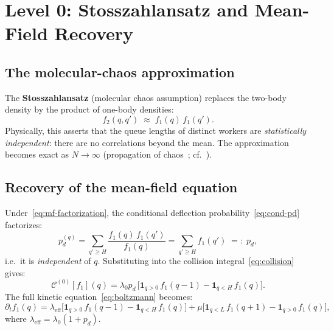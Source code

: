 \documentclass[11pt,a4paper]{article}
\newcommand{\pd}{p_d}
\newcommand{\fone}{f_1}
\newcommand{\ftwo}{f_2}
\newcommand{\cC}{\mathcal{C}}
\begin{document}
\section{Level 0: Stosszahlansatz and Mean-Field Recovery}

\subsection{The molecular-chaos approximation}

The \textbf{Stosszahlansatz} (molecular chaos assumption) replaces the
two-body density by the product of one-body densities:
\begin{equation}
  \ftwo(q, q') \;\approx\; \fone(q)\,\fone(q').
  \label{eq:mf-factorization}
\end{equation}
Physically, this asserts that the queue lengths of distinct workers are
\emph{statistically independent}: there are no correlations beyond the
mean.  The approximation becomes exact as $N \to \infty$
(propagation of chaos~\cite{mckean1967,sznitman1991}; cf.\ \cite{kac1956}).

\subsection{Recovery of the mean-field equation}

Under~\eqref{eq:mf-factorization}, the conditional deflection
probability~\eqref{eq:cond-pd} factorizes:
\[
  \pd^{(q)} = \sum_{q' \geq H} \frac{\fone(q)\,\fone(q')}{\fone(q)}
  = \sum_{q' \geq H} \fone(q') \;=:\; \pd,
\]
i.e.\ it is \emph{independent} of $q$.  Substituting into the collision
integral~\eqref{eq:collision} gives:
\[
  \cC^{(0)}[\fone](q)
  = \lambda_0 \pd\,
    \bigl[\mathbf{1}_{q>0}\,\fone(q-1) - \mathbf{1}_{q < H}\,\fone(q)\bigr].
\]
The full kinetic equation~\eqref{eq:boltzmann} becomes:
\begin{equation}
  \partial_t \fone(q)
  = \lambda_{\mathrm{eff}}\bigl[\mathbf{1}_{q>0}\,\fone(q-1)
  - \mathbf{1}_{q<H}\,\fone(q)\bigr]
  + \mu\bigl[\mathbf{1}_{q<L}\,\fone(q+1) - \mathbf{1}_{q>0}\,\fone(q)\bigr],
  \label{eq:mf-kinetic}
\end{equation}
where $\lambda_{\mathrm{eff}} = \lambda_0(1 + \pd)$.
\end{document}
